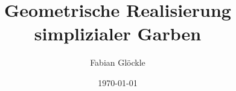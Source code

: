 



\title{Geometrische Realisierung simplizialer Garben}
\author{Fabian Glöckle}
\date{\today}
\maketitle

\tableofcontents


%
%
%
%
%
%

\cite{KS} \cite{TG} \cite{GJ} \cite{BBP} \cite{GM}






